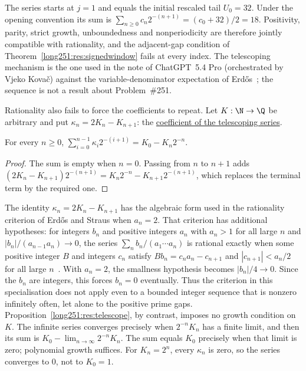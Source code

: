 \noindent The series starts at $j=1$ and equals the initial rescaled tail
$U_0=32$.  Under the opening convention its sum is
$\sum_{n\ge0}c_n2^{-(n+1)}=(c_0+32)/2=18$.
Positivity, parity, strict growth, unboundedness and nonperiodicity are
therefore jointly compatible with rationality, and the adjacent-gap condition of
Theorem~\ref{long251:res:signedwindow} fails at every index.  The telescoping mechanism
is the one used in the note of ChatGPT~5.4 Pro (orchestrated by Vjeko
Kova\v{c}) against the variable-denominator expectation of
Erd\H{o}s~\cite[Theorem~1 and proof, pp.~1--2]{kovac2026}; the sequence is not a
result about Problem~\#251.

Rationality also fails to force the coefficients to repeat.  Let $K:\N\to\Q$ be
arbitrary and put $\kappa_n=2K_n-K_{n+1}$: the
\href{https://github.com/wcook04/plectis-erdos/blob/3d6d938d696fed0fb71dd55115a18a73738ff223/lean/ErdosProblems/Erdos251/PrimeGapDyadicTail.lean\#L1129}{coefficient of the telescoping series}.

\begin{proposition}\label{long251:res:telescope}
For every $n\ge0$,
$\sum_{i=0}^{n-1}\kappa_i2^{-(i+1)}=K_0-K_n2^{-n}$.
\end{proposition}

\begin{proof}
The sum is empty when $n=0$.  Passing from $n$ to $n+1$ adds
$(2K_n-K_{n+1})2^{-(n+1)}=K_n2^{-n}-K_{n+1}2^{-(n+1)}$,
which replaces the terminal term by the required one.
\end{proof}

\noindent The identity $\kappa_n=2K_n-K_{n+1}$ has the algebraic form used in
the rationality criterion of Erd\H{o}s and Straus when $a_n=2$.  That criterion
has additional hypotheses: for integers $b_n$ and
positive integers $a_n$ with $a_n>1$ for all large $n$ and
$|b_n|/(a_{n-1}a_n)\to0$, the series $\sum_nb_n/(a_1\cdots a_n)$ is rational
exactly when some positive integer $B$ and integers $c_n$ satisfy
$Bb_n=c_na_n-c_{n+1}$ and $|c_{n+1}|<a_n/2$ for all large
$n$~\cite[Theorem~2.1, pp.~85--86]{erdosstraus1974}.  With $a_n=2$,
the smallness hypothesis becomes $|b_n|/4\to0$.  Since the $b_n$ are
integers, this forces $b_n=0$ eventually.  Thus the criterion in this
specialisation does not apply even to a bounded integer sequence that
is nonzero infinitely often, let alone to the positive prime gaps.
Proposition~\ref{long251:res:telescope}, by contrast, imposes no growth
condition on $K$.  The infinite series converges precisely when
$2^{-n}K_n$ has a finite limit, and then its sum is
$K_0-\lim_{n\to\infty}2^{-n}K_n$.  The sum equals $K_0$ precisely when
that limit is zero; polynomial growth suffices.  For $K_n=2^n$, every
$\kappa_n$ is zero, so the series converges to $0$, not to $K_0=1$.

